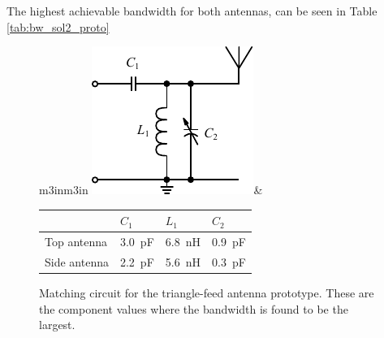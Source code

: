 The highest achievable bandwidth for both antennas, can be seen in Table \ref{tab:bw_sol2_proto} 

\begin{figure}[htbp]
        \centering
        \begin{tabular}{m{3in}m{3in}}
            \centering
            \includegraphics{img/tech_sol/schematic_tuning_1}&
            \centering
            \footnotesize
            \begin{tabular}{|l|l|l|l|}
                \hline
                & $C_1$ & $L_1$ & $C_2$ \\
                \hline
                Top antenna & \SI{3.0}{pF} & \SI{6.8}{nH} & \SI{0.9}{pF} \\
                Side antenna & \SI{2.2}{pF} & \SI{5.6}{nH} & \SI{0.3}{pF} \\
                \hline
            \end{tabular}
        \end{tabular}
    \caption{Matching circuit for the triangle-feed antenna prototype. These are the component values where the bandwidth is found to be the largest.}
    \label{fig:triang_proto_matching}
\end{figure}

